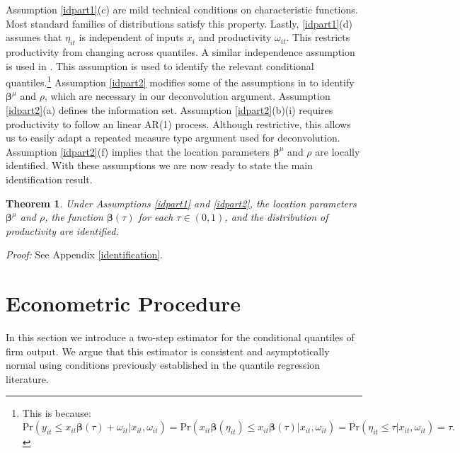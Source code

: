 \documentclass[12pt]{article}
\newtheorem{theorem}{Theorem}[section]
\begin{document}
Assumption \ref{idpart1}(c) are mild technical conditions on characteristic functions. Most standard families of distributions satisfy this property. Lastly, \ref{idpart1}(d) assumes that $\eta_{it}$ is independent of inputs $x_{i}$ and productivity $\omega_{it}$. This restricts productivity from changing across quantiles. A similar independence assumption is used in \cite{Gandhi2020}.  This assumption is used to identify the relevant conditional quantiles.\footnote{This is because:
\begin{equation*}
\text{Pr}(y_{it}\leq x_{it}\boldsymbol{\beta}(\tau)+\omega_{it}|x_{it}, \omega_{it})=\text{Pr}(x_{it}\boldsymbol{\beta}(\eta_{it})\leq x_{it}\boldsymbol{\beta}(\tau)|x_{it}, \omega_{it})=\text{Pr}(\eta_{it}\leq \tau|x_{it}, \omega_{it})=\tau.
\end{equation*}}
Assumption \ref{idpart2} modifies some of the assumptions in \cite{Ackerberg2015} to identify $\boldsymbol{\beta}^{\mu}$ and $\rho$, which are necessary in our deconvolution argument. Assumption \ref{idpart2}(a) defines the information set.  Assumption \ref{idpart2}(b)(i) requires productivity to follow an linear AR(1) process. Although restrictive, this allows us to easily adapt a repeated measure type argument used for deconvolution. Assumption \ref{idpart2}(f) implies that the location parameters $\boldsymbol{\beta}^{\mu}$ and $\rho$ are locally identified. With these assumptions we are now ready to state the main identification result.

\begin{theorem} \label{idtheorem}
Under Assumptions \ref{idpart1} and \ref{idpart2}, the location parameters $\boldsymbol{\beta}^{\mu}$ and $\rho$, the function $\boldsymbol{\beta}(\tau)$ for each $\tau\in(0,1)$, and the distribution of productivity are identified.
\end{theorem}


\noindent \textit{Proof:} See Appendix \ref{identification}.
\section{Econometric Procedure} \label{estimation}
In this section we introduce a two-step estimator for the conditional quantiles of firm output. We argue that this estimator is consistent and asymptotically normal using conditions previously established in the quantile regression literature.  
\end{document}
